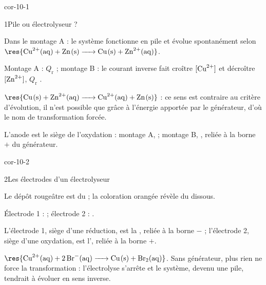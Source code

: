 \corrigesSouples

\begin{blocLivre}{cor-10-1}
\begin{corrige}{1}{Pile ou électrolyseur ?}
\begin{questions}
\item Dans le montage A : le système fonctionne en pile et évolue spontanément selon
$\res{\ce{Cu^2+(aq) + Zn(s) -> Cu(s) + Zn^2+(aq)}}$.
\item Montage A : $Q_\mathrm{r}$  ; montage B : le courant inverse fait croître
$[\ce{Cu^2+}]$ et décroître $[\ce{Zn^2+}]$, $Q_\mathrm{r}$ .
\item $\res{\ce{Cu(s) + Zn^2+(aq) -> Cu^2+(aq) + Zn(s)}}$ : ce sens est contraire au critère d'évolution, il n'est
possible que grâce à l'énergie apportée par le générateur, d'où le nom de transformation forcée.
\item L'anode est le siège de l'oxydation : montage A,  ; montage B, , reliée à la borne $+$ du générateur.
\end{questions}
\end{corrige}
\end{blocLivre}
\begin{blocLivre}{cor-10-2}
\begin{corrige}{2}{Les électrodes d'un électrolyseur}
\begin{questions}
\item Le dépôt rougeâtre est du  ; la coloration orangée révèle du  dissous.
\item Électrode 1 :  ; électrode 2 : .
\item L'électrode 1, siège d'une réduction, est la , reliée à la borne $-$ ; l'électrode 2, siège
d'une oxydation, est l', reliée à la borne $+$.
\item $\res{\ce{Cu^2+(aq) + 2 Br^-(aq) -> Cu(s) + Br2(aq)}}$. Sans générateur, plus rien ne force la transformation :
l'électrolyse s'arrête et le système, devenu une pile, tendrait à évoluer en sens inverse.
\end{questions}
\end{corrige}
\end{blocLivre}
